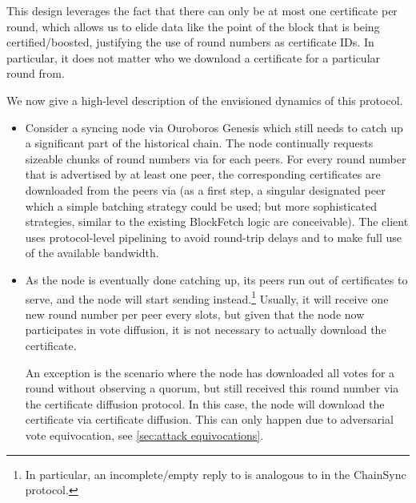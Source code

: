 This design leverages the fact that there can only be at most one certificate per round, which allows us to elide data like the point of the block that is being certified/boosted, justifying the use of round numbers as certificate IDs.
In particular, it does not matter who we download a certificate for a particular round from.

We now give a high-level description of the envisioned dynamics of this protocol.

\begin{itemize}
\item
  Consider a syncing node via Ouroboros Genesis which still needs to catch up a significant part of the historical chain.
  The node continually requests sizeable chunks of round numbers via  for each peers.
  For every round number that is advertised by at least one peer, the corresponding certificates are downloaded from the peers via  (as a first step, a singular designated peer which a simple batching strategy could be used; but more sophisticated strategies, similar to the existing BlockFetch logic are conceivable).
  The client uses protocol-level pipelining to avoid round-trip delays and to make full use of the available bandwidth.
\item
  As the node is eventually done catching up, its peers run out of certificates to serve, and the node will start sending  instead.\footnote{
  In particular, an incomplete/empty reply to  is analogous to  in the ChainSync protocol.}
  Usually, it will receive one new round number per peer every \perasRoundSlots{} slots, but given that the node now participates in vote diffusion, it is not necessary to actually download the certificate.

  An exception is the scenario where the node has downloaded all votes for a round without observing a quorum, but still received this round number via the certificate diffusion protocol.
  In this case, the node will download the certificate via certificate diffusion.
  This can only happen due to adversarial vote equivocation, see \cref{sec:attack equivocations}.
\end{itemize}

